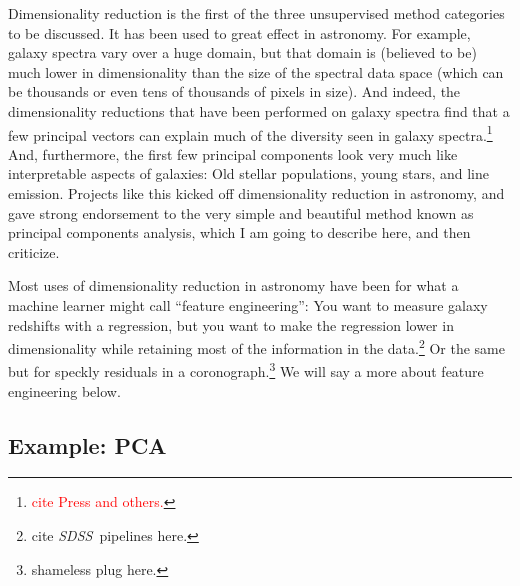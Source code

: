 \documentclass[12pt, twoside, letterpaper]{article}
\newcommand{\acronym}[1]{{\small{#1}}}
\newcommand{\project}[1]{\textsl{#1}}
\newcommand{\SDSS}{\project{\acronym{SDSS}}}
\newcommand{\todo}[1]{\textcolor{red}{#1}}  %
\begin{document}
Dimensionality reduction is the first of the three unsupervised
method categories to be discussed.
It has been used to great effect in astronomy.
For example, galaxy spectra vary over a huge domain, but that
domain is (believed to be) much lower in dimensionality than the size
of the spectral data space (which can be thousands or even tens of
thousands of pixels in size).
And indeed, the dimensionality reductions that have been performed on
galaxy spectra find that a few principal vectors can explain much of
the diversity seen in galaxy spectra.\footnote{\todo{cite Press and
    others.}}
And, furthermore, the first few principal components look very much
like interpretable aspects of galaxies: Old stellar populations, young
stars, and line emission.
Projects like this kicked off dimensionality reduction in astronomy,
and gave strong endorsement to the very simple and beautiful method
known as principal components analysis, which I am going to describe
here, and then criticize.

Most uses of dimensionality reduction in astronomy have been for 
what a machine learner might call ``feature engineering'': You want
to measure galaxy redshifts with a regression, but you want to make the regression
lower in dimensionality while retaining most of the information
in the data.\footnote{cite \SDSS\ pipelines here.}
Or the same but for speckly residuals in a coronograph.\footnote{shameless plug here.}
We will say a more about feature engineering below.

\subsection{Example: PCA}
\end{document}
